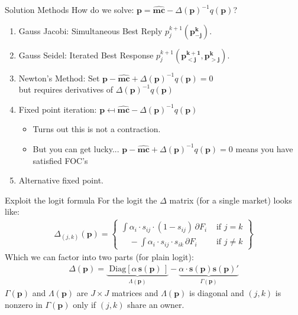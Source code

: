 \begin{frame}{Solution Methods}
How do we solve: $\mathbf{p} = \widehat{\mathbf{mc}} - \Delta(\mathbf{p})^{-1}q(\mathbf{p})$?
\begin{enumerate}
\item Gauss Jacobi: Simultaneous Best Reply  $p_j^{k+1}(\mathbf{p_{-j}^k})$.
\item Gauss Seidel: Iterated Best Response  $p_j^{k+1}(\mathbf{p_{<j}^{k+1}},\mathbf{p_{>j}^{k}})$.
\item Newton's Method: Set $\mathbf{p} - \widehat{\mathbf{mc}} + \Delta(\mathbf{p})^{-1}q(\mathbf{p})=0$\\ but requires derivatives of $\Delta(\mathbf{p})^{-1}q(\mathbf{p})$
\item Fixed point iteration: $\mathbf{p} \mapsfrom \widehat{\mathbf{mc}} - \Delta(\mathbf{p})^{-1}q(\mathbf{p})$
\begin{itemize}
\item Turns out this is \alert{not a contraction}.
\item But you can get lucky... $\mathbf{p} - \widehat{\mathbf{mc}} + \Delta(\mathbf{p})^{-1}q(\mathbf{p})=0$ means you have satisfied FOC's
\end{itemize}
\item Alternative fixed point.
\end{enumerate}
\end{frame} 

\begin{frame}{Exploit the logit formula}
For the logit the $\Delta$ matrix (for a single market) looks like:
\begin{align*}
\Delta_{(j,k)}(\mathbf{p}) = \left\{\begin{array}{lr}
       \int \alpha_i \cdot s_{ij}\cdot (1-s_{ij}) \, \partial F_i& \text{ if } j=k \\
          \quad -\int \alpha_i \cdot s_{ij} \cdot s_{ik} \, \partial F_i &  \text{ if }  j\neq k 
        \end{array} \right\}
\end{align*}
Which we can factor into two parts (for plain logit):
\begin{align*}
\Delta(\mathbf{p}) =  \underbrace{\text{ Diag}\left[ \alpha \, \mathbf{s}(\mathbf{p}) \, \right]}_{\Lambda(\mathbf{p})} -  \underbrace{\alpha \cdot \mathbf{s}(\mathbf{p}) \mathbf{s}(\mathbf{p})'}_{\Gamma(\mathbf{p})}
\end{align*}
$\Gamma(\mathbf{p})$ and $\Lambda(\mathbf{p})$ are $J \times J$ matrices and $\Lambda(\mathbf{p})$ is diagonal and $(j,k)$ is nonzero in $\Gamma(\mathbf{p})$ only if $(j,k)$ share an owner.
\end{frame}


